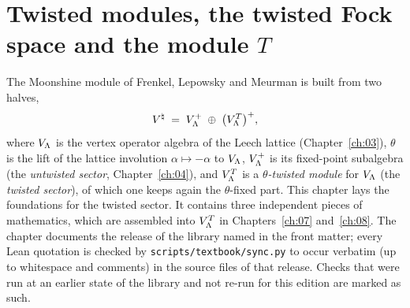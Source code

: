 \chapter{Twisted modules, the twisted Fock space and the module \texorpdfstring{$T$}{T}}\label{ch:06}
\begingroup\sloppy

\providecommand{\chsixS}{S[\theta]}
\providecommand{\chsixeps}{\varepsilon}

The Moonshine module of Frenkel, Lepowsky and Meurman is built from two halves,
\begin{equation*}
  {V^{\natural}} \;=\; V_{\Lambda}^{+} \;\oplus\; \bigl(V_{\Lambda}^{T}\bigr)^{+},
\end{equation*}
where $V_{\Lambda}$ is the vertex operator algebra of the Leech lattice (Chapter~\ref{ch:03}),
$\theta$ is the lift of the lattice involution $\alpha\mapsto-\alpha$ to $V_{\Lambda}$, $V_{\Lambda}^+$
is its fixed-point subalgebra (the \emph{untwisted sector}, Chapter~\ref{ch:04}), and
$V_{\Lambda}^T$ is a \emph{$\theta$-twisted module} for $V_{\Lambda}$ (the \emph{twisted sector}), of
which one keeps again the $\theta$-fixed part.  This chapter lays the foundations for the twisted
sector.  It contains three independent pieces of mathematics, which are assembled into
$V_{\Lambda}^T$ in Chapters~\ref{ch:07} and~\ref{ch:08}.  The chapter documents the release of the library named in the front matter; every Lean quotation is checked by \texttt{scripts/textbook/sync.py} to occur verbatim
(up to whitespace and comments) in the source files of that release. Checks that were run at an earlier state of the library and not re-run for this edition are marked as such.

